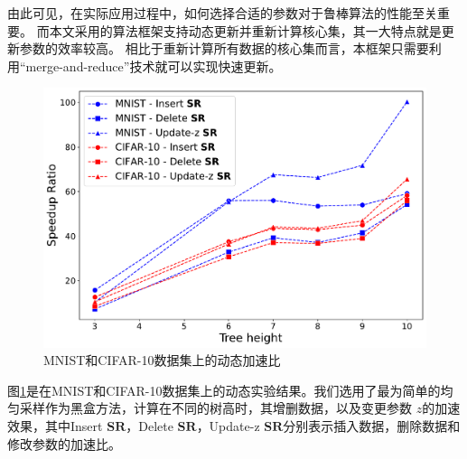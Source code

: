 由此可见，在实际应用过程中，如何选择合适的参数对于鲁棒算法的性能至关重要。
而本文采用的算法框架支持动态更新并重新计算核心集，其一大特点就是更新参数的效率较高。
相比于重新计算所有数据的核心集而言，本框架只需要利用“merge-and-reduce”技术就可以实现快速更新。


\begin{figure}
    \centering
    \includegraphics[width =0.6\linewidth]{./fig/dynamic.pdf}
    \caption{MNIST和CIFAR-10数据集上的动态加速比}
    \label{fig:dynamic}
\end{figure}

图\ref{fig:dynamic}是在MNIST和CIFAR-10数据集上的动态实验结果。我们选用了最为简单的均匀采样作为黑盒方法，计算在不同的树高时，其增删数据，以及变更参数
$z$的加速效果，其中Insert $\mathbf{SR}$，Delete $\mathbf{SR}$，Update-z $\mathbf{SR}$分别表示插入数据，删除数据和修改参数的加速比。

